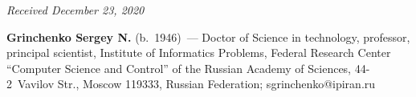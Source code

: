 \vspace*{-3pt}

\hfill{\small\textit{Received December 23, 2020}}




\Contrl

\noindent
\textbf{Grinchenko Sergey N.} (b.\ 1946)~--- Doctor of Science in technology, professor, principal 
scientist, Institute of Informatics Problems, Federal Research Center ``Computer Science and 
Control'' of the Russian Academy of Sciences, 44-2~Vavilov Str., Moscow 119333, Russian 
Federation; \mbox{sgrinchenko@ipiran.ru}

\label{end\stat}

\renewcommand{\bibname}{\protect\rm Литература} 